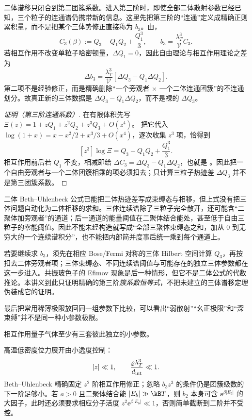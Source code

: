 二体谱移只闭合到第二团簇系数。进入第三阶时，即使全部二体散射参数已经已知，三个粒子的连通谱仍携带新的信息。这里先把第三阶的“连通”定义成精确正则累积量，而不是把某个三体势修正直接称为 \(b_3\)。由，
\begin{equation}\label{eq:phys-sm-third-connected-canonical}
 C_3(\beta)
 :=Q_3-Q_1Q_2+\frac{Q_1^3}{3},
 \qquad
 b_3=\frac{\lambda_T^3}{\mathcal V}C_3.
\end{equation}
若相互作用不改变单粒子哈密顿量，\(\Delta Q_1=0\)，因此自由理论与相互作用理论之差为
\begin{equation}
 \Delta b_3
 =\frac{\lambda_T^3}{\mathcal V}
 \left[
 \Delta Q_3-Q_1\Delta Q_2
 \right].
 \label{eq:phys-sm-delta-b3}
\end{equation}
第二项不是经验修正，而是精确删除“一个旁观者 \(\times\) 一个二体连通团簇”的不连通划分。故真正新的三体数据是
\(
\Delta Q_3-Q_1\Delta Q_2
\)，而不是裸的 \(\Delta Q_3\)。

\begin{proof}[证明（第三阶连通系数）]
在有限体积先写
\(\Xi(z)=1+zQ_1+z^2Q_2+z^3Q_3+O(z^4)\)。
把它代入
\(\log(1+x)=x-x^2/2+x^3/3+O(x^4)\)，逐次收集 \(z^3\) 项，恰得到
\[
[z^3]\log\Xi=Q_3-Q_1Q_2+\frac{Q_1^3}{3}.
\]
相互作用前后若 \(Q_1\) 不变，相减即给
\(\Delta C_3=\Delta Q_3-Q_1\Delta Q_2\)，也就是
。因此把一个自由旁观者与一个二体团簇相乘的项必须扣去；只计算三粒子热迹差 \(\Delta Q_3\) 并不是第三团簇系数。
\end{proof}

二体 Beth--Uhlenbeck 公式已能把二体热迹差写成束缚态与相移，但上式没有把三体问题自动化为二体相移的求和。三体连续谱除了三粒子完全散开，还可能含“二聚体加旁观者”的通道；后一通道的能量阈值在二聚体结合能处，甚至低于自由三粒子的零能阈值。因此不能未经构造就写成“全部三聚体束缚态之和，加从 \(0\) 到无穷大的一个连续谱积分”，也不能把内部简并度事后统一乘到每个通道上。

若要继续求 \(b_3\)，须先在相应 Bose/Fermi 对称的三体 Hilbert 空间计算 \(Q_3\)，再按 扣去二体旁观者项；三体束缚态、不同连续谱阈值与可能存在的独立三体参数都在这一步进入。共振玻色子的 Efimov 现象是后一种情形，但它不是二体公式的代数推论。本讲义到此只证明精确的第三阶\emph{簇系数恒等式}，不把未建立的三体谱移定理伪装成它的证明。

最后把常用稀薄极限放回同一组参数下比较，可以看出“弱散射”“幺正极限”和“深束缚”并不是同一种小参数极限。

相互作用量子气体至少有三套彼此独立的小参数。

高温低密度位力展开由小逸度控制：
\[
 |z|\ll1,
 \qquad
 \frac{\varrho\lambda_T^3}{d_{\rm int}}\ll1.
\]
Beth--Uhlenbeck 精确固定 \(z^2\) 阶相互作用修正；忽略 \(b_3z^3\) 的条件仍是团簇级数的下一阶足够小。若 \(a>0\) 且二聚体结合能 \(|E_b|\gg\kB T\)，则 \(b_2\) 本身可含 \(\ee^{\beta|E_b|}\) 的大因子，此时还必须要求相应分子活度 \(z^2\ee^{\beta|E_b|}\ll1\)，否则简单截断到二阶并不受控。


